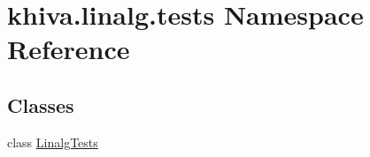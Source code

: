 \hypertarget{namespacekhiva_1_1linalg_1_1tests}{}\section{khiva.\+linalg.\+tests Namespace Reference}
\label{namespacekhiva_1_1linalg_1_1tests}
\subsection*{Classes}
\begin{DoxyCompactItemize}
\item 
class \mbox{\hyperlink{classkhiva_1_1linalg_1_1tests_1_1_linalg_tests}{Linalg\+Tests}}
\end{DoxyCompactItemize}
